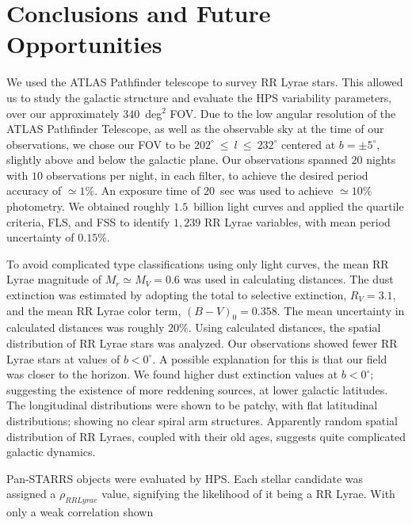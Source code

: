 \documentclass[aps,prb,twocolumn,superscriptaddress]{revtex4-1}
\begin{document}
\section{Conclusions and Future Opportunities}

We used the ATLAS Pathfinder telescope to survey RR Lyrae stars.  This allowed us to study the galactic structure and evaluate the HPS variability parameters, over our approximately $340$~deg$^2$ FOV. Due to the low angular resolution of the ATLAS Pathfinder Telescope, as well as the observable sky at the time of our observations, we chose our FOV to be $202^{\circ}~\leq~l~\leq~232^{\circ}$ centered at $b=\pm5^{\circ}$, slightly above and below the galactic plane. Our observations spanned $20$ nights with $10$ observations per night, in each filter, to achieve the desired period accuracy of $\simeq 1\%$. An exposure time of $20$~sec was used to achieve $\simeq 10\%$ photometry. We obtained roughly $1.5$~billion light curves and applied the quartile criteria, FLS, and FSS to identify $1,239$ RR Lyrae variables, with mean period uncertainty of $0.15\%$.

\indent To avoid complicated type classifications using only light curves, the mean RR Lyrae magnitude of $M_r \simeq M_V = 0.6$ was used in calculating distances. The dust extinction was estimated by adopting the total to selective extinction, $R_V=3.1$, and the mean RR Lyrae color term, $(B-V)_0 = 0.358$. The mean uncertainty in calculated distances was roughly $20\%$.  Using calculated distances, the spatial distribution of RR Lyrae stars was analyzed. 
Our observations showed fewer RR Lyrae stars at values of $b<0^{\circ}$.  A possible explanation for this is that our field was closer to the horizon.
We found higher dust extinction values at $b<0^{\circ}$; suggesting the existence of more reddening sources, at lower galactic latitudes.  
The longitudinal distributions were shown to be patchy, with flat latitudinal distributions; showing no clear spiral arm structures. 
Apparently random spatial distribution of RR Lyraes, coupled with their old ages, suggests quite complicated galactic dynamics.


\indent Pan-STARRS objects were evaluated by HPS.  Each stellar candidate was assigned a $\rho_{RRLyrae}$ value, signifying the likelihood of it being a RR Lyrae.  With only a weak correlation shown
\end{document}
